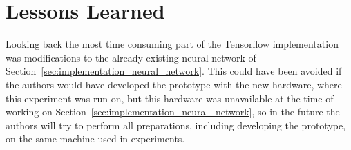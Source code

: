 \section{Lessons Learned}
Looking back the most time consuming part of the Tensorflow implementation was modifications to the already existing neural network of Section~\ref{sec:implementation_neural_network}. This could have been avoided if the authors would have developed the prototype with the new hardware, where this experiment was run on, but this hardware was unavailable at the time of working on Section~\ref{sec:implementation_neural_network}, so in the future the authors will try to perform all preparations, including developing the prototype, on the same machine used in experiments.

\filbreak
